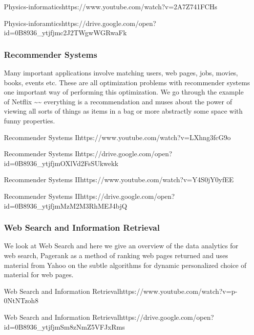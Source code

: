   {Physics-informatics}{https://www.youtube.com/watch?v=2A7Z741FCHs}

  {Physics-inforamtics}{https://drive.google.com/open?id=0B8936_ytjfjmc2J2TWgwWGRwaFk}


\subsubsection{Recommender Systems}\label{recommender-systems}

Many important applications involve matching users, web pages, jobs,
movies, books, events etc. These are all optimization problems with
recommender systems one important way of performing this optimization.
We go through the example of Netflix \textasciitilde{}\textasciitilde{}
everything is a recommendation and muses about the power of viewing all
sorts of things as items in a bag or more abstractly some space with
funny properties.


  {Recommender Systems  I}{https://www.youtube.com/watch?v=LXhng3fcG9o}



  {Recommender  Systems I}{https://drive.google.com/open?id=0B8936_ytjfjmOXlVd2FsSUkwekk}



  {Recommender Systems
  II}{https://www.youtube.com/watch?v=Y4S0jY0yfEE}

  {Recommender
  Systems II}{https://drive.google.com/open?id=0B8936_ytjfjmMzM2M3RhMEJ4bjQ}


\subsubsection{Web Search and Information
Retrieval}\label{web-search-and-information-retrieval}

We look at Web Search and here we give an overview of the
data analytics for web search, Pagerank as a method of ranking web pages
returned and uses material from Yahoo on the subtle algorithms for
dynamic personalized choice of material for web pages.


   {Web Search and  Information Retrieval}{https://www.youtube.com/watch?v=p-0NtNTzoh8}


  {Web  Search and Information Retrieval}{https://drive.google.com/open?id=0B8936_ytjfjmSm8zNmZ5VFJxRms}


